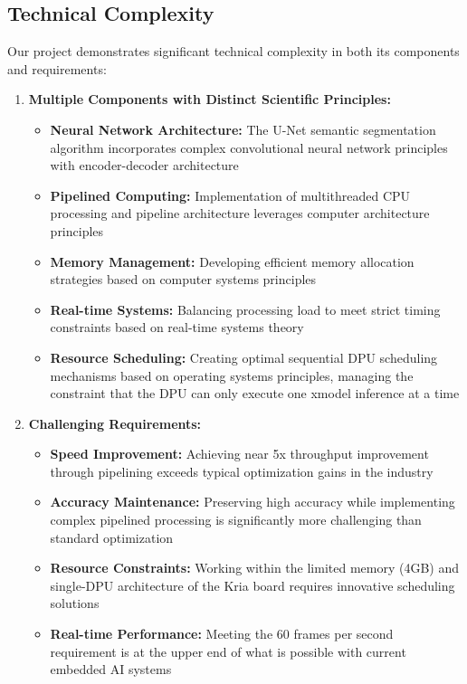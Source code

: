 \subsection{Technical Complexity}\label{subsec:technical-complexity}

Our project demonstrates significant technical complexity in both its components and requirements:

\begin{enumerate}
\item \textbf{Multiple Components with Distinct Scientific Principles:}
   \begin{itemize}
   \item \textbf{Neural Network Architecture:} The U-Net semantic segmentation algorithm incorporates complex convolutional neural network principles with encoder-decoder architecture~\cite{burden2013}
   \item \textbf{Pipelined Computing:} Implementation of multithreaded CPU processing and pipeline architecture leverages computer architecture principles~\cite{zhao2023parallel}
   \item \textbf{Memory Management:} Developing efficient memory allocation strategies based on computer systems principles
   \item \textbf{Real-time Systems:} Balancing processing load to meet strict timing constraints based on real-time systems theory
   \item \textbf{Resource Scheduling:} Creating optimal sequential DPU scheduling mechanisms based on operating systems principles, managing the constraint that the DPU can only execute one xmodel inference at a time
   \end{itemize}

\item \textbf{Challenging Requirements:}
   \begin{itemize}
   \item \textbf{Speed Improvement:} Achieving near 5x throughput improvement through pipelining exceeds typical optimization gains in the industry
   \item \textbf{Accuracy Maintenance:} Preserving high accuracy while implementing complex pipelined processing is significantly more challenging than standard optimization
   \item \textbf{Resource Constraints:} Working within the limited memory (4GB) and single-DPU architecture of the Kria board requires innovative scheduling solutions
   \item \textbf{Real-time Performance:} Meeting the 60 frames per second requirement is at the upper end of what is possible with current embedded AI systems
   \end{itemize}
\end{enumerate}

